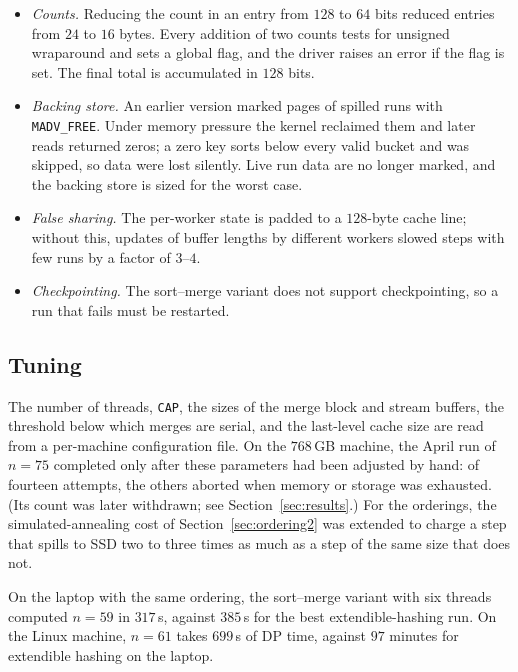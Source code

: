 \documentclass[12pt]{article}
\theoremstyle{definition}
\begin{document}
\begin{itemize}[nosep]
  \item \emph{Counts.} Reducing the count in an entry from $128$ to $64$ bits
        reduced entries from $24$ to $16$ bytes. Every addition of two counts
        tests for unsigned wraparound and sets a global flag, and the driver
        raises an error if the flag is set. The final total is accumulated in
        $128$ bits.
  \item \emph{Backing store.} An earlier version marked pages of spilled
        runs with \texttt{MADV\_FREE}. Under memory pressure the kernel
        reclaimed them and later reads returned zeros; a zero key sorts below
        every valid bucket and was skipped, so data were lost silently. Live
        run data are no longer marked, and the backing store is sized for the
        worst case.
  \item \emph{False sharing.} The per-worker state is padded to a $128$-byte
        cache line; without this, updates of buffer lengths by different
        workers slowed steps with few runs by a factor of $3$--$4$.
  \item \emph{Checkpointing.} The sort--merge variant does not support
        checkpointing, so a run that fails must be restarted.
\end{itemize}

\subsection{Tuning}

The number of threads, \texttt{CAP}, the sizes of the merge block and stream
buffers, the threshold below which merges are serial, and the last-level
cache size are read from a per-machine configuration file.
On the $768$\,GB machine, the April run of $n=75$ completed only after these
parameters had been adjusted by hand: of fourteen attempts, the others aborted
when memory or storage was exhausted. (Its count was later withdrawn; see
Section~\ref{sec:results}.)
For the orderings, the simulated-annealing cost of
Section~\ref{sec:ordering2} was extended to charge a step that spills to SSD
two to three times as much as a step of the same size that does not.

On the laptop with the same ordering, the sort--merge variant with six
threads computed $n=59$ in $317$\,s, against $385$\,s for the best
extendible-hashing run.
On the Linux machine, $n=61$ takes $699$\,s of DP time, against $97$ minutes
for extendible hashing on the laptop.
\end{document}
